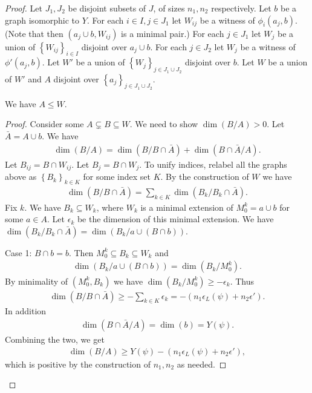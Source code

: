 \documentclass{amsart}
\newcommand{\Y}{Y}
\newcommand{\curly}[1]{\left\{#1\right\}}
\newcommand{\paren}[1]{\left(#1\right)}
\begin{document}
\begin{proof}
  Let $J_1, J_2$ be disjoint subsets of $J$, of sizes $n_1, n_2$ respectively.
  Let $b$ be a graph isomorphic to $\Y$.
  For each $i \in I, j \in J_1$ let $W_{ij}$ be a witness of $\phi_i(a_j, b)$.
  (Note that then $(a_j \cup b, W_{ij})$ is a minimal pair.)
  For each $j \in J_1$ let $W_j$ be a union of $\curly{W_{ij}}_{i \in I}$ disjoint over $a_j \cup b$.
  For each $j \in J_2$ let $W_{j}$ be a witness of $\phi'(a_j, b)$.
  Let $W'$ be a union of $\curly{W_j}_{j \in J_1 \cup J_2}$ disjoint over $b$.
  Let $W$ be a union of $W'$ and $A$ disjoint over $\curly{a_j}_{j \in J_1 \cup J_2}$.
  \begin{Claim}
    We have $A \leq W$.
  \end{Claim}
  \begin{proof}
    Consider some $A \subsetneq B \subseteq W$.
    We need to show $\dim (B/A) > 0$.
    Let $\bar A = A \cup b$.
    We have
    \begin{align*}
      \dim(B/A) = \dim(B/ B \cap \bar A) + \dim(B \cap \bar A / A).
    \end{align*}
    Let $B_{ij} = B \cap W_{ij}$.
    Let $B_{j} = B \cap W_{j}$.
    To unify indices, relabel all the graphs above as $\curly{B_k}_{k \in K}$ for some index set $K$.
    By the construction of $W$ we have
    \begin{align*}
      \dim(B/ B \cap \bar A) = \sum_{k \in K} \dim(B_k/ B_k \cap \bar A).
    \end{align*}
    Fix $k$.
    We have $B_k \subseteq W_k$, where $W_k$ is a minimal extension of $M^k_0 = a \cup b$ for some $a \in A$.
    Let $\epsilon_k$ be the dimension of this minimal extension.
    We have $\dim(B_k / B_k \cap \bar A) = \dim(B_k / a \cup (B \cap b))$.

    Case 1: $B \cap b = b$.
    Then $M_0^k \subseteq B_k \subseteq W_k$ and
    \begin{align*}
      \dim(B_k / a \cup (B \cap b)) = \dim (B_k/M_0^k).
    \end{align*}
    By minimality of $(M_0^k, B_k)$ we have $\dim (B_k/M_0^k) \geq -\epsilon_k$.
    Thus
    \begin{align*}
      \dim(B/ B \cap \bar A) \geq - \sum_{k \in K} \epsilon_k = -\paren{n_1 \epsilon_L(\psi) + n_2 \epsilon'}.
    \end{align*}
    In addition
    \begin{align*}
      \dim(B \cap \bar A / A) = \dim (b) = Y(\psi).
    \end{align*}
    Combining the two, we get
    \begin{align*}
      \dim(B/A) \geq Y(\psi) - \paren{n_1 \epsilon_L(\psi) + n_2 \epsilon'},
    \end{align*}
    which is positive by the construction of $n_1, n_2$ as needed.
    

\end{proof}
\end{proof}
\end{document}
